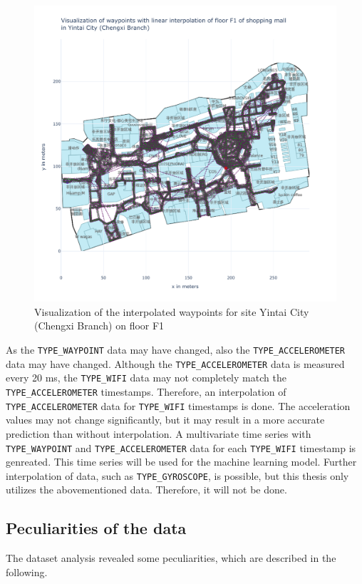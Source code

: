 \begin{figure}[h!]
    \centering
    \includegraphics[scale=0.6]{images/whole_floor_visualization_interpolated.pdf}
    \caption{Visualization of the interpolated waypoints for site Yintai City (Chengxi Branch) on floor F1}
    \label{fig:vis-interpolated}
\end{figure}

As the \texttt{TYPE\_WAYPOINT} data may have changed, also the \texttt{TYPE\_ACCELEROMETER} data may have changed.
Although the \texttt{TYPE\_ACCELEROMETER} data is measured every 20 ms, the \texttt{TYPE\_WIFI} data may not completely match the \texttt{TYPE\_ACCELEROMETER} timestamps.
Therefore, an interpolation of \texttt{TYPE\_ACCELEROMETER} data for \texttt{TYPE\_WIFI} timestamps is done.
The acceleration values may not change significantly, but it may result in a more accurate prediction than without interpolation.
A multivariate time series with \texttt{TYPE\_WAYPOINT} and \texttt{TYPE\_ACCELEROMETER} data for each \texttt{TYPE\_WIFI} timestamp is genreated.
This time series will be used for the machine learning model.
Further interpolation of data, such as \texttt{TYPE\_GYROSCOPE}, is possible, but this thesis only utilizes the abovementioned data.
Therefore, it will not be done.\\

\subsection{Peculiarities of the data}\label{sec:special-cases}
The dataset analysis revealed some peculiarities, which are described in the following.

